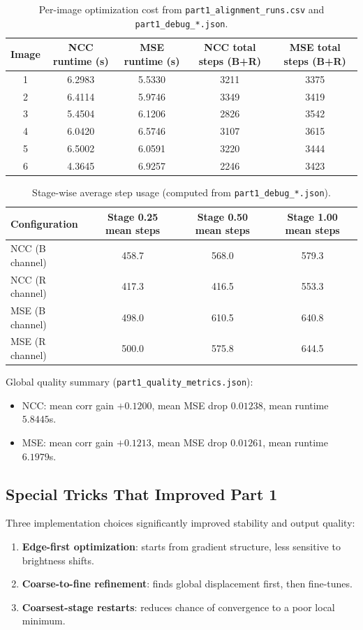 {\begin{table}[htbp]
\centering
\small
\begin{tabular}{c|cc|cc}
\hline
Image & NCC runtime (s) & MSE runtime (s) & NCC total steps (B+R) & MSE total steps (B+R)\\
\hline
1 & 6.2983 & 5.5330 & 3211 & 3375\\
2 & 6.4114 & 5.9746 & 3349 & 3419\\
3 & 5.4504 & 6.1206 & 2826 & 3542\\
4 & 6.0420 & 6.5746 & 3107 & 3615\\
5 & 6.5002 & 6.0591 & 3220 & 3444\\
6 & 4.3645 & 6.9257 & 2246 & 3423\\
\hline
\end{tabular}
\caption{Per-image optimization cost from \texttt{part1\_alignment\_runs.csv} and \texttt{part1\_debug\_*.json}.}
\label{tab:p1-runtime-steps}
\end{table}

\begin{table}[htbp]
\centering
\small
\begin{tabular}{l|ccc}
\hline
Configuration & Stage 0.25 mean steps & Stage 0.50 mean steps & Stage 1.00 mean steps\\
\hline
NCC (B channel) & 458.7 & 568.0 & 579.3\\
NCC (R channel) & 417.3 & 416.5 & 553.3\\
MSE (B channel) & 498.0 & 610.5 & 640.8\\
MSE (R channel) & 500.0 & 575.8 & 644.5\\
\hline
\end{tabular}
\caption{Stage-wise average step usage (computed from \texttt{part1\_debug\_*.json}).}
\label{tab:p1-stage-steps}
\end{table}

Global quality summary (\texttt{part1\_quality\_metrics.json}):
\begin{itemize}
\item NCC: mean corr gain $+0.1200$, mean MSE drop $0.01238$, mean runtime $5.8445$s.
\item MSE: mean corr gain $+0.1213$, mean MSE drop $0.01261$, mean runtime $6.1979$s.
\end{itemize}

\subsection*{Special Tricks That Improved Part 1}
\label{sec:p1-tricks}
Three implementation choices significantly improved stability and output quality:
\begin{enumerate}
\item \textbf{Edge-first optimization}: starts from gradient structure, less sensitive to brightness shifts.
\item \textbf{Coarse-to-fine refinement}: finds global displacement first, then fine-tunes.
\item \textbf{Coarsest-stage restarts}: reduces chance of convergence to a poor local minimum.
\end{enumerate}

}
